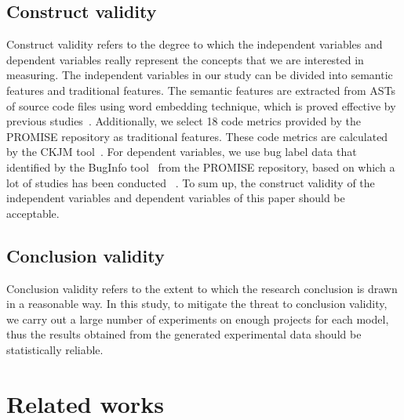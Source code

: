 \documentclass[journal]{IEEEtran}
\begin{document}
\subsection{Construct validity}
Construct validity refers to the degree to which the independent variables and dependent variables really represent the concepts that we are interested in measuring. The independent variables in our study can be divided into semantic features and traditional features. The semantic features are extracted from ASTs of source code files using word embedding technique, which is proved effective by previous studies~\cite{liang2019seml,fan2019deep}. Additionally, we select 18 code metrics provided by the PROMISE repository as traditional features. These code metrics are calculated by the CKJM tool~\cite{jureczko2010towards}. For dependent variables, we use bug label data that identified by the BugInfo tool~\cite{jureczko2010using} from the PROMISE repository, based on which a lot of studies has been conducted ~\cite{wang2018deep,liang2019seml,fan2019deep}. To sum up, the construct validity of the independent variables and dependent variables of this paper should be acceptable.

\subsection{Conclusion validity}
Conclusion validity refers to the extent to which the research conclusion is drawn in a reasonable way. In this study, to mitigate the threat to conclusion validity, we carry out a large number of experiments on enough projects for each model, thus the results obtained from the generated experimental data should be statistically reliable. 

\section{Related works}
\end{document}
